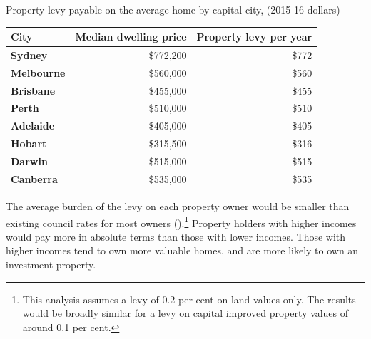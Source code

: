 \documentclass[twoside,english]{grattanBudgetRepairb5portrait}
\begin{document}
\begin{table}
%
{Property levy payable on the average home by capital city, (2015-16 dollars)}
\begin{tabularx}{\columnwidth}{lRR}
\toprule
\textbf{City} & {\textbf{Median dwelling price}} & \textbf{Property levy per year} \\
\midrule
\textbf{Sydney} & {\$772,200} & \$772 \\
\textbf{Melbourne} & {\$560,000} & \$560 \\
\textbf{Brisbane} & {\$455,000} & \$455 \\
\textbf{Perth} & {\$510,000} & \$510 \\
\textbf{Adelaide} & {\$405,000} & \$405 \\
\textbf{Hobart} & {\$315,500} & \$316 \\
\textbf{Darwin} & {\$515,000} & \$515 \\
\textbf{Canberra} & {\$535,000} & \$535 \\
\bottomrule
\end{tabularx}

\end{table}

The average burden of the levy on each property owner would be
smaller than existing council rates for most owners ().\footnote{This analysis assumes a levy of 0.2 per cent on land values only. The results
would be broadly similar for a levy on capital improved property values of around
0.1 per cent.}
Property holders with higher incomes would pay more in absolute
terms than those with lower incomes. Those with higher incomes
tend to own more valuable homes, and are more likely to own an
investment property.
\end{document}

